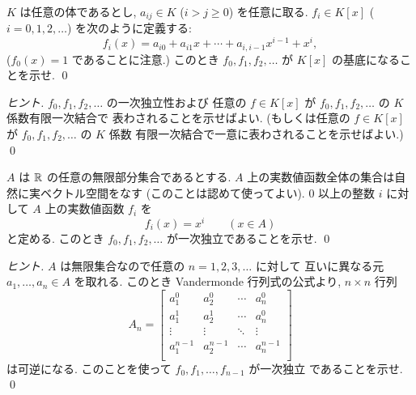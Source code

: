 \documentclass[12pt,twoside]{jarticle}
\begin{document}
\begin{question}[10点]
  $K$ は任意の体であるとし, $a_{ij}\in K$ ($i>j\ge 0$) を任意に取る.
  $f_i\in K[x]$  ($i=0,1,2,\ldots$) を次のように定義する:
  \begin{equation*}
    f_i(x) = a_{i0} + a_{i1}x + \cdots + a_{i,i-1}x^{i-1} + x^i,
  \end{equation*}
  ($f_0(x)=1$ であることに注意.)
  このとき $f_0,f_1,f_2,\ldots$ が $K[x]$ の基底になることを示せ.
  \qed
\end{question}

\begin{proof}[ヒント]
  $f_0,f_1,f_2,\ldots$ の一次独立性および
  任意の $f\in K[x]$ が $f_0,f_1,f_2,\ldots$ の $K$ 係数有限一次結合で
  表わされることを示せばよい. 
  (もしくは任意の $f\in K[x]$ が $f_0,f_1,f_2,\ldots$ の $K$ 係数
  有限一次結合で一意に表わされることを示せばよい.)
  \qed
\end{proof}

\begin{question}[10点]
  \label{q:lin-indep-x^k}
  $A$ は ${\mathbb R}$ の任意の無限部分集合であるとする.
  $A$ 上の実数値函数全体の集合は自然に実ベクトル空間をなす
  (このことは認めて使ってよい).
  $0$ 以上の整数 $i$ に対して $A$ 上の実数値函数 $f_i$ を
  \begin{equation*}
    f_i(x) = x^i \qquad (x\in A)
  \end{equation*}
  と定める. このとき $f_0,f_1,f_2,\ldots$ が一次独立であることを示せ.
  \qed
\end{question}

\begin{proof}[ヒント]
  $A$ は無限集合なので任意の $n=1,2,3,\ldots$ に対して
  互いに異なる元 $a_1,\ldots,a_n\in A$ を取れる.
  このとき Vandermonde 行列式の公式より, $n\times n$ 行列
  \begin{equation*}
    A_n = 
    \begin{bmatrix}
      a_1^0     & a_2^0     & \cdots & a_n^0     \\
      a_1^1     & a_2^1     & \cdots & a_n^0     \\
      \vdots    & \vdots    & \ddots & \vdots    \\
      a_1^{n-1} & a_2^{n-1} & \cdots & a_n^{n-1} \\
    \end{bmatrix}
  \end{equation*}
  は可逆になる. このことを使って $f_0,f_1,\ldots,f_{n-1}$ が一次独立
  であることを示せ. \qed
\end{proof}
\end{document}
